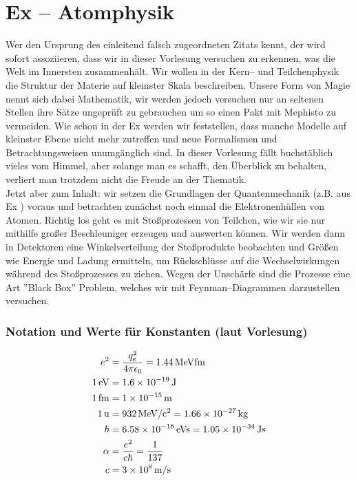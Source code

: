 \documentclass[Ex4_Zusammenfassung.tex]{subfiles}
\begin{document}
\chapter{ Ex  -- Atomphysik}

 Wer den Ursprung des einleitend falsch zugeordneten Zitats kennt, der wird sofort assoziieren, dass wir in dieser Vorlesung versuchen zu erkennen, was die Welt im Innersten zusammenhält. Wir wollen in der Kern-- und Teilchenphysik die Struktur der Materie auf kleinster Skala beschreiben. Unsere Form von Magie nennt sich dabei Mathematik, wir werden jedoch versuchen nur an seltenen Stellen ihre Sätze ungeprüft zu gebrauchen um so einen Pakt mit Mephisto zu vermeiden. Wie schon in der Ex  werden wir feststellen, dass manche Modelle auf kleinster Ebene nicht mehr zutreffen und neue Formalismen und Betrachtungsweisen unumgänglich sind. In dieser Vorlesung fällt buchstäblich vieles vom Himmel, aber solange man es schafft, den Überblick zu behalten, verliert man trotzdem nicht die Freude an der Thematik.\\

Jetzt aber zum Inhalt: wir setzen die Grundlagen der Quantenmechanik (z.B. aus Ex ) voraus und betrachten zunächst noch einmal die Elektronenhüllen von Atomen. Richtig los geht es mit Stoßprozessen von Teilchen, wie wir sie nur mithilfe großer Beschleuniger erzeugen und auswerten können. Wir werden dann in Detektoren eine Winkelverteilung der Stoßprodukte beobachten und Größen wie Energie und Ladung ermitteln, um Rückschlüsse auf die Wechselwirkungen während des Stoßprozesses zu ziehen. Wegen der Unschärfe sind die Prozesse eine Art ''Black Box'' Problem, welches wir mit Feynman--Diagrammen darzustellen versuchen. 

\subsection*{Notation und Werte für Konstanten (laut Vorlesung)}
\begin{align*}
	e^2 &= \frac{q_e^2}{4\pi \epsilon_{0}} = \SI{1.44}{MeV fm}  \\
	\SI{1}{eV} &= \SI{1.6E-19}{J}  \\
	\SI{1}{fm} &= \SI{1E-15}{m}\\ 
	\SI{1}{u} &=  \SI{932}{MeV/c^2} = \SI{1.66E-27}{kg} \\
	\hslash &= \SI{6.58E-16}{eV s}= \SI{1.05E-34}{Js} \\
	\alpha &= \frac {e^2}{c \hslash} = \frac{1}{137} \\
	c &= \SI{3E8}{m/s}
\end{align*} 
\end{document}
